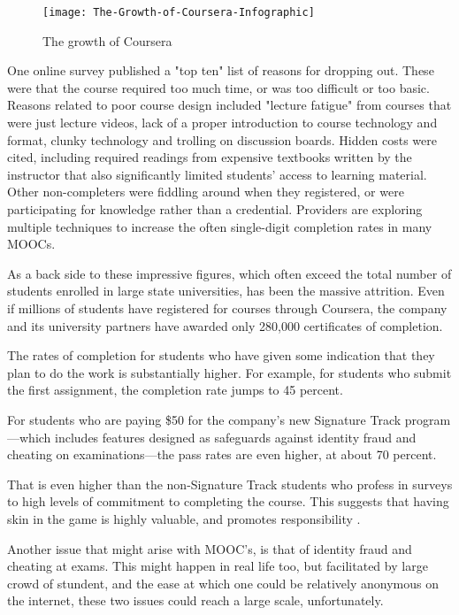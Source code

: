 \begin{figure}[p]
\centering
\texttt{[image: The-Growth-of-Coursera-Infographic]}
\caption{The growth of Coursera}
\label{fig:The growth of Coursera}
\end{figure}

One online survey published a "top ten" list of reasons for dropping out.
These were that the course required too much time, or was too difficult or too
basic. Reasons related to poor course design included "lecture fatigue" from
courses that were just lecture videos, lack of a proper introduction to course
technology and format, clunky technology and trolling on discussion boards.
Hidden costs were cited, including required readings from expensive textbooks
written by the instructor that also significantly limited students' access to
learning material. Other non-completers were fiddling around when
they registered, or were participating for knowledge rather than a credential.
Providers are exploring multiple techniques to increase the often single-digit
completion rates in many MOOCs.

As a back side to these impressive figures, which often exceed the
total number of students enrolled in large state universities, has been the massive attrition.
Even if millions of students have registered for courses through Coursera, the
company and its university partners have awarded only 280,000 certificates of
completion.

The rates of completion for students who have given some indication that they
plan to do the work is substantially higher. For example, for students who
submit the first assignment, the completion rate jumps to 45 percent.

For students who are paying \$50 for the company’s new Signature Track
program—which includes features designed as safeguards against identity fraud
and cheating on examinations—the pass rates are even higher, at about 70
percent.

That is even higher than the non-Signature Track students who profess
in surveys to high levels of commitment to completing the course. This suggests
that having skin in the game is highly valuable, and promotes responsibility \citep{courseradropout}.

Another issue that might arise with MOOC's, is that of identity fraud and cheating
at exams. This might happen in real life too, but facilitated by large crowd of stundent,
and the ease at which one could be relatively anonymous on the internet, these
two issues could reach a large scale, unfortunately.

